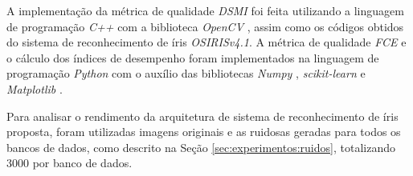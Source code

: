 \par A implementação da métrica de qualidade \textit{\acrshort{DSMI}} foi feita utilizando a linguagem de programação \textit{C++} com a biblioteca \textit{OpenCV} \cite{opencv}, assim como os códigos obtidos do sistema de reconhecimento de íris \textit{OSIRISv4.1}. A métrica de qualidade \textit{\acrshort{FCE}} e o cálculo dos índices de desempenho foram implementados na linguagem de programação \textit{Python} com o auxílio das bibliotecas \textit{Numpy} \cite{numpy}, \textit{scikit-learn} \cite{scikitlearn} e \textit{Matplotlib} \cite{matplotlib}.


\par Para analisar o rendimento da arquitetura de sistema de reconhecimento de íris proposta, foram utilizadas imagens originais e as ruidosas geradas para todos os bancos de dados, como descrito na Seção \ref{sec:experimentos:ruidos}, totalizando 3000 por banco de dados.

